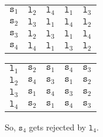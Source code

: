 \documentclass[a4paper, openany]{memoir}
\begin{document}
    \begin{table}[H]
        \centering
        \begin{subtable}{0.45\textwidth}
            \centering
            \begin{tabular}{c|cccc}
                $\texttt{s}_1$ & {\color{blue!60} $\texttt{l}_2$} & \underline{$\texttt{l}_4$} & $\texttt{l}_1$ & $\texttt{l}_3$ \\
                $\texttt{s}_2$ & \underline{$\texttt{l}_3$} & $\texttt{l}_1$ & $\texttt{l}_4$ & $\texttt{l}_2$ \\
                $\texttt{s}_3$ & \underline{$\texttt{l}_2$} & $\texttt{l}_3$ & $\texttt{l}_1$ & $\texttt{l}_4$ \\
                $\texttt{s}_4$ & {\color{blue!60} $\texttt{l}_4$} & $\texttt{l}_1$ & $\texttt{l}_3$ & $\texttt{l}_2$
            \end{tabular}
        \end{subtable}
        \hfill
        \begin{subtable}{0.45\textwidth}
            \centering
            \begin{tabular}{c|cccc}
                $\texttt{l}_1$ & $\texttt{s}_2$ & $\texttt{s}_1$ & $\texttt{s}_4$ & $\texttt{s}_3$ \\
                $\texttt{l}_2$ & $\texttt{s}_4$ & \underline{$\texttt{s}_3$} & $\texttt{s}_1$ & $\texttt{s}_2$ \\
                $\texttt{l}_3$ & $\texttt{s}_1$ & $\texttt{s}_4$ & $\texttt{s}_3$ & \underline{$\texttt{s}_2$} \\
                $\texttt{l}_4$ & $\texttt{s}_2$ & \underline{$\texttt{s}_1$} & $\texttt{s}_4$ & $\texttt{s}_3$
            \end{tabular}
        \end{subtable}
    \end{table}
    \noindent So, $\texttt{s}_4$ gets rejected by $\texttt{l}_4$.
\end{document}
